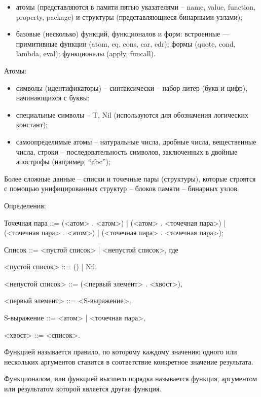 \documentclass[12pt]{report}
\begin{document}
\begin{itemize}
	\item атомы (представляются в памяти пятью указателями  --  name, value, function, property, package) и структуры (представляющиеся бинарными узлами);
	\item базовые (несколько) функций, функционалов и форм: встроенные — примитивные функции (atom, eq, cons, car, cdr); формы (quote, cond, lambda, eval); функционалы (apply, funcall).
\end{itemize}

Атомы:
\begin{itemize} 
	\item символы (идентификаторы) – синтаксически – набор литер (букв и цифр), начинающихся с буквы;
	\item специальные символы – {T, Nil} (используются для обозначения логических констант);
	\item самоопределимые атомы – натуральные числа, дробные числа, вещественные числа, строки – последовательность символов, заключенных в двойные апострофы (например, “abc”);
\end{itemize} 

Более сложные данные – списки и точечные пары (структуры), которые строятся с помощью унифицированных структур – блоков памяти – бинарных узлов.

Определения:

Точечная пара ::= (<атом> . <атом>) | (<атом> . <точечная пара>) | (<точечная пара> . <атом>) | (<точечная пара> . <точечная пара>);

Список ::= <пустой список> | <непустой список>, где 

<пустой список> ::= () | Nil,

<непустой список> ::= (<первый элемент> . <хвост>),

<первый элемент> ::= <S-выражение>,

S-выражение ::= <атом> | <точечная пара>,

<хвост> ::= <список>.


Функцией называется правило, по которому каждому значению одного или нескольких  аргументов ставится в соответствие конкретное значение результата. 


Функционалом, или функцией высшего порядка называется функция, аргументом или  результатом которой является другая функция.
\end{document}

